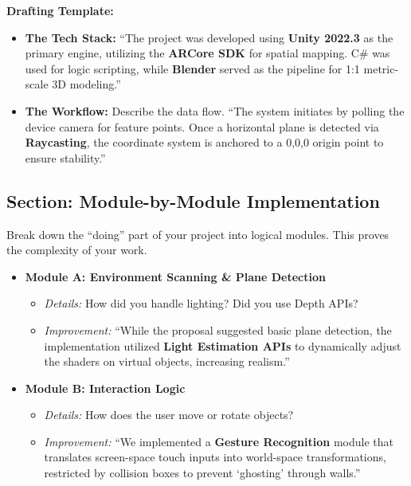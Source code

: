 \documentclass{report}
\begin{document}
\textbf{Drafting Template:}

\begin{itemize}
  \item \textbf{The Tech Stack:} ``The project was developed using \textbf{Unity
    2022.3} as the primary engine, utilizing the \textbf{ARCore SDK} for
    spatial mapping. C\# was used for logic scripting, while \textbf{Blender}
    served as the pipeline for 1:1 metric-scale 3D modeling.''
  \item \textbf{The Workflow:} Describe the data flow. ``The system initiates by
    polling the device camera for feature points. Once a horizontal plane is
    detected via \textbf{Raycasting}, the coordinate system is anchored to a
    0,0,0 origin point to ensure stability.''
\end{itemize}

\subsection{Section: Module-by-Module Implementation}

Break down the ``doing'' part of your project into logical modules. This proves
the complexity of your work.

\begin{itemize}
  \item \textbf{Module A: Environment Scanning \& Plane Detection}
    \begin{itemize}
      \item \textit{Details:} How did you handle lighting? Did you use Depth
        APIs?
      \item \textit{Improvement:} ``While the proposal suggested basic plane
        detection, the implementation utilized \textbf{Light Estimation APIs}
        to dynamically adjust the shaders on virtual objects, increasing
        realism.''
    \end{itemize}
  \item \textbf{Module B: Interaction Logic}
    \begin{itemize}
      \item \textit{Details:} How does the user move or rotate objects?
      \item \textit{Improvement:} ``We implemented a \textbf{Gesture
        Recognition} module that translates screen-space touch inputs into
        world-space transformations, restricted by collision boxes to prevent
        `ghosting' through walls.''
    \end{itemize}
\end{itemize}
\end{document}
